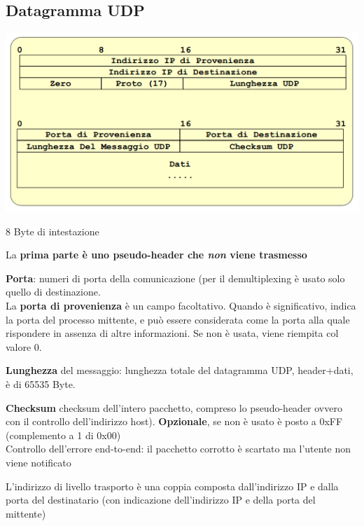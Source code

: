 \documentclass[10pt]{article}
\begin{document}
\subsection{Datagramma UDP}
\begin{center}
\includegraphics[scale=1]{udpdatagram.png}
\end{center}
\begin{list}{}{}
\item 8 Byte di intestazione
\item La \textbf{prima parte è uno pseudo-header che \textit{non} viene trasmesso}
\item \textbf{Porta}: numeri di porta della comunicazione (per il demultiplexing è usato solo quello di destinazione.\\
La \textbf{porta di provenienza} è un campo facoltativo. Quando è significativo, indica la porta del processo mittente, e può essere considerata come la porta alla quale rispondere in assenza di altre informazioni. Se non è usata, viene riempita col valore 0.
\item \textbf{Lunghezza} del messaggio: lunghezza totale del datagramma UDP, header+dati, è di 65535 Byte.
\item \textbf{Checksum} checksum dell'intero pacchetto, compreso lo pseudo-header ovvero con il controllo dell'indirizzo host). \textbf{Opzionale}, se non è usato è posto a 0xFF (complemento a 1 di 0x00)\\
Controllo dell'errore end-to-end: il pacchetto corrotto è scartato ma l'utente non viene notificato
\item L'indirizzo di livello trasporto è una coppia composta dall'indirizzo IP e dalla porta del destinatario (con indicazione dell'indirizzo IP e della porta del mittente)
\end{list}
\end{document}
